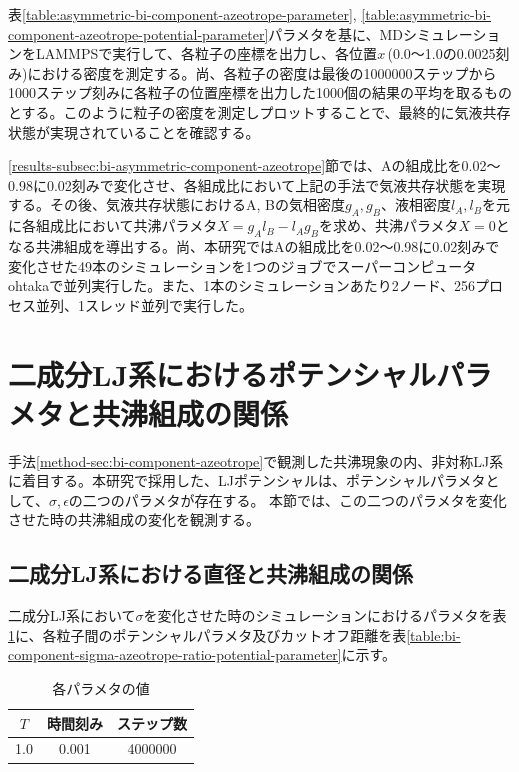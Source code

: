 \documentclass[titlepage]{jsreport}
\begin{document}
\newpage
表\ref{table:asymmetric-bi-component-azeotrope-parameter}, \ref{table:asymmetric-bi-component-azeotrope-potential-parameter}パラメタを基に、MDシミュレーションをLAMMPSで実行して、各粒子の座標を出力し、各位置$x$\,(0.0〜1.0の0.0025刻み)における密度を測定する。尚、各粒子の密度は最後の1000000ステップから1000ステップ刻みに各粒子の位置座標を出力した1000個の結果の平均を取るものとする。このように粒子の密度を測定しプロットすることで、最終的に気液共存状態が実現されていることを確認する。

\ref{results-subsec:bi-asymmetric-component-azeotrope}節では、Aの組成比を0.02〜0.98に0.02刻みで変化させ、各組成比において上記の手法で気液共存状態を実現する。その後、気液共存状態におけるA, Bの気相密度$g_A, g_B$、液相密度$l_A, l_B$を元に各組成比において共沸パラメタ$X=g_Al_B-l_Ag_B$を求め、共沸パラメタ$X=0$となる共沸組成を導出する。尚、本研究ではAの組成比を0.02〜0.98に0.02刻みで変化させた49本のシミュレーションを1つのジョブでスーパーコンピュータohtakaで並列実行した。また、1本のシミュレーションあたり2ノード、256プロセス並列、1スレッド並列で実行した。


\section{二成分LJ系におけるポテンシャルパラメタと共沸組成の関係} \label{method-sec:bi-component-potential-parameter-azeotrope-ratio}
手法\ref{method-sec:bi-component-azeotrope}で観測した共沸現象の内、非対称LJ系に着目する。本研究で採用した、LJポテンシャルは、ポテンシャルパラメタとして、${\sigma}$,\,${\epsilon}$の二つのパラメタが存在する。
本節では、この二つのパラメタを変化させた時の共沸組成の変化を観測する。


\subsection{二成分LJ系における直径と共沸組成の関係} \label{method-subsec:bi-component-sigma-azeotrope-ratio}
二成分LJ系において${\sigma}$を変化させた時のシミュレーションにおけるパラメタを表\ref{table:bi-component-sigma-azeotrope-ratio-parameter}に、各粒子間のポテンシャルパラメタ及びカットオフ距離を表\ref{table:bi-component-sigma-azeotrope-ratio-potential-parameter}に示す。

\begin{table}[htbp]
    \begin{center}
        \caption{各パラメタの値}
        \label{table:bi-component-sigma-azeotrope-ratio-parameter}
        \begin{tabular}{c c c}
            $T$ & 時間刻み & ステップ数 \\
            \hline
            1.0 & 0.001 & 4000000 \\
        \end{tabular}
    \end{center}
\end{table}
\end{document}
